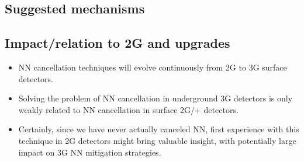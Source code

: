 \subsection{Suggested mechanisms}

\subsection{Impact/relation to 2G and upgrades}
\begin{itemize}
\item NN cancellation techniques will evolve continuously from 2G to 3G surface detectors. 
\item Solving the problem of NN cancellation in underground 3G detectors is only weakly related to NN cancellation in surface 2G/+ detectors. 
\item Certainly, since we have never actually canceled NN, first experience with this technique in 2G detectors might bring valuable insight, with potentially large impact on 3G NN mitigation strategies.
\end{itemize}
